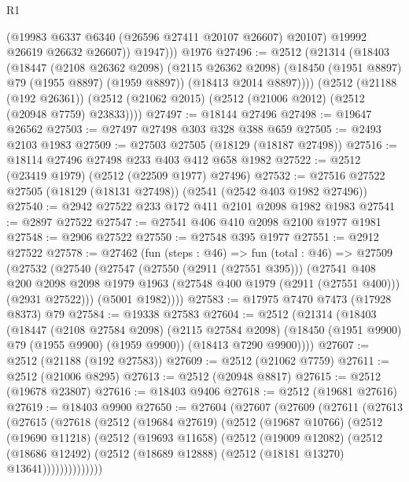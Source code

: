 \begin{lexlean}{R1}
\begin{coremodule}
            (@19983 @6337 @6340 (@26596 @27411 @20107 @26607) @20107)
            @19992
            @26619
            @26632
            @26607))
          @1947)))
    @1976
@27496 := @2512
    (@21314
      (@18403
        (@18447
          (@2108 @26362 @2098)
          (@2115 @26362 @2098)
          (@18450 (@1951 @8897) @79 (@1955 @8897) (@1959 @8897))
          (@18413 @2014 @8897))))
    (@2512
      (@21188 (@192 @26361))
      (@2512 (@21062 @2015) (@2512 (@21006 @2012) (@2512 (@20948 @7759) @23833))))
@27497 := @18144 @27496
@27498 := @19647 @26562
@27503 := @27497 @27498 @303 @328 @388 @659
@27505 := @2493 @2103 @1983
@27509 := @27503 @27505 (@18129 (@18187 @27498))
@27516 := @18114 @27496 @27498 @233 @403 @412 @658 @1982
@27522 := @2512 (@23419 @1979) (@2512 (@22509 @1977) @27496)
@27532 := @27516 @27522 @27505 (@18129 (@18131 @27498)) (@2541 (@2542 @403 @1982 @27496))
@27540 := @2942 @27522 @233 @172 @411 @2101 @2098 @1982 @1983
@27541 := @2897 @27522
@27547 := @27541 @406 @410 @2098 @2100 @1977 @1981
@27548 := @2906 @27522
@27550 := @27548 @395 @1977
@27551 := @2912 @27522
@27578 := @27462
    (fun (steps : @46) =>
    fun (total : @46) =>
    @27509
      (@27532
        (@27540
          (@27547
            (@27550 (@2911 (@27551 @395)))
            (@27541
              @408
              @200
              @2098
              @2098
              @1979
              @1963
              (@27548 @400 @1979 (@2911 (@27551 @400)))
              (@2931 @27522)))
          (@5001 @1982))))
@27583 := @17975 @7470 @7473 (@17928 @8373) @79
@27584 := @19338 @27583
@27604 := @2512
    (@21314
      (@18403
        (@18447
          (@2108 @27584 @2098)
          (@2115 @27584 @2098)
          (@18450 (@1951 @9900) @79 (@1955 @9900) (@1959 @9900))
          (@18413 @7290 @9900))))
@27607 := @2512 (@21188 (@192 @27583))
@27609 := @2512 (@21062 @7759)
@27611 := @2512 (@21006 @8295)
@27613 := @2512 (@20948 @8817)
@27615 := @2512 (@19678 @23807)
@27616 := @18403 @9406
@27618 := @2512 (@19681 @27616)
@27619 := @18403 @9900
@27650 := @27604
    (@27607
      (@27609
        (@27611
          (@27613
            (@27615
              (@27618
                (@2512
                  (@19684 @27619)
                  (@2512
                    (@19687 @10766)
                    (@2512
                      (@19690 @11218)
                      (@2512
                        (@19693 @11658)
                        (@2512
                          (@19009 @12082)
                          (@2512
                            (@18686 @12492)
                            (@2512 (@18689 @12888) (@2512 (@18181 @13270) @13641))))))))))))))

\end{coremodule}
\end{lexlean}
